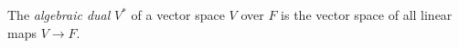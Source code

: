 
The \emph{algebraic dual} $V^*$ of a vector space $V$ over $F$ is the vector space of all linear maps $V\to F$.
